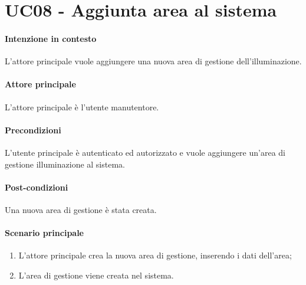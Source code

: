 \section{UC08 - Aggiunta area al sistema}\label{uc:08}
\paragraph{Intenzione in contesto} L'attore principale vuole aggiungere una nuova area di gestione dell'illuminazione.


\paragraph{Attore principale} L'attore principale è l'utente manutentore.



\paragraph{Precondizioni}
L'utente principale è autenticato ed autorizzato e vuole aggiungere un'area di gestione illuminazione al sistema.

\paragraph{Post-condizioni}
Una nuova area di gestione è stata creata.

\paragraph{Scenario principale}
\begin{enumerate}
    \item L'attore principale crea la nuova area di gestione, inserendo i dati dell'area;
    \item L'area di gestione viene creata nel sistema.
\end{enumerate}
